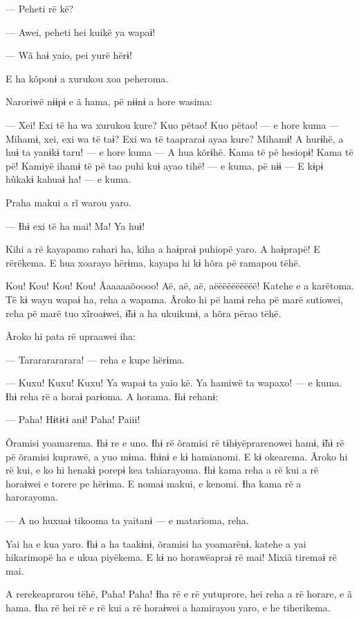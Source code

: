 --- Peheti rë kë?

--- Awei, peheti hei kuikë ya wapaɨ! 

--- Wã haɨ yaio, pei yurë hërɨ! 

E ha kõponɨ a xurukou xoa peheroma. 

Naroriwë nɨɨpɨ e ã hama, pë nɨɨnɨ a hore wasima: 

--- Xei! Exi të ha wa xurukou kure? Kuo pëtao! Kuo pëtao! --- e hore
kuma --- Mihamɨ, xei, exi wa të taɨ? Exi wa të taapraraɨ ayaa kure?
Mihamɨ! A hurɨhë, a huɨ ta yanɨkɨ taru! --- e hore kuma --- A hua
kõrɨhë. Kama të pë hesiopɨ! Kama të pë! Kamiyë ihamɨ të pë tao puhi kuɨ
ayao tihë! --- e kuma, pë nɨɨ --- E kɨpɨ hũkakɨ kahuaɨ ha! --- e kuma. 

Praha makui a rĩ warou yaro. 

--- Ɨhɨ exi të ha mai! Ma! Ya huɨ! 

Kihi a rë kayapamo rahari ha, kiha a haɨpraɨ puhiopë yaro. A haɨprapë! E
rërëkema. E hua xoarayo hërɨma, kayapa hi kɨ hõra pë ramapou tëhë. 

Kou! Kou! Kou! Kou! Ãaaaaaõoooo! Aë, aë, aë, aëëëëëëëëëë! Katehe e a
karëtoma. Të kɨ wayu wapaɨ ha, reha a wapama. Ãroko hi pë hamɨ reha pë
marë sutiowei, reha pë marë tuo xĩroaɨwei, ɨ̃hɨ a ha ukuikunɨ, a hõra
përao tëhë. 

Ãroko hi pata rë upraawei iha:

--- Tarararararara! --- reha e kupe hërɨma. 

--- Kuxu! Kuxu! Kuxu! Ya wapaɨ ta yaio kë. Ya hamiwë ta wapaxo! --- e
kuma. Ɨhɨ reha rë a horaɨ parɨoma. A horama. Ɨhɨ rehanɨ: 

--- Paha! Hɨtɨtɨ anɨ! Paha! Paiii! 

Õramisi yoamarema. Ɨhɨ re e uno. Ɨhɨ rë õramisi rë tɨhɨyëprarenowei
hamɨ, ɨ̃hɨ rë pë õramisi kuprawë, a yuo mɨma. Ɨhɨnɨ e kɨ hamianomi. E kɨ
okearema. Ãroko hi rë kui, e ko hi henakɨ porepɨ kea tahiarayoma. Ɨhɨ
kama reha a rë kui a rë horaɨwei e torere pe hërɨma. E nomaɨ makui, e
kenomi. Ɨha kama rë a harorayoma. 

 

--- A no huxuaɨ tikooma ta yaitanɨ --- e matarioma, reha. 

Yai ha e kua yaro. Ɨhɨ a ha taakɨnɨ, õramisi ha yoamarënɨ, katehe a yai
hikarimopë ha e ukua piyëkema. E kɨ no horawëapraɨ rë mai! Mixiã tiremaɨ
rë mai. 

A rerekeaprarou tëhë, Paha! Paha! Ɨha rë e rë yutuprore, hei reha a rë
horare, e ã hama. Ɨha rë hei rë e rë kui a rë horaɨwei a hamirayou yaro,
e he tiherikema. 

